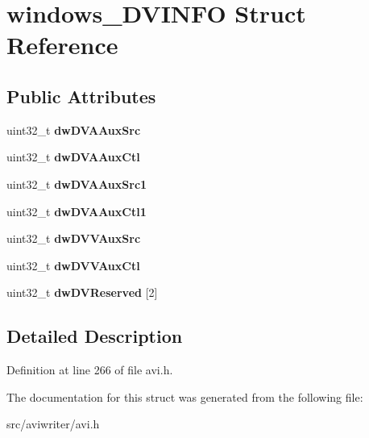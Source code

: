 \hypertarget{structwindows__DVINFO}{\section{windows\-\_\-\-D\-V\-I\-N\-F\-O Struct Reference}
\label{structwindows__DVINFO}
}
\subsection*{Public Attributes}
\begin{DoxyCompactItemize}
\item 
\hypertarget{structwindows__DVINFO_af9c99d343d9d098d07879ca20ac9487f}{uint32\-\_\-t {\bfseries dw\-D\-V\-A\-Aux\-Src}}\label{structwindows__DVINFO_af9c99d343d9d098d07879ca20ac9487f}

\item 
\hypertarget{structwindows__DVINFO_a0d099a096f4f1d1b686d22f54068febf}{uint32\-\_\-t {\bfseries dw\-D\-V\-A\-Aux\-Ctl}}\label{structwindows__DVINFO_a0d099a096f4f1d1b686d22f54068febf}

\item 
\hypertarget{structwindows__DVINFO_aeb2553b1821fb6070f457affbd30193b}{uint32\-\_\-t {\bfseries dw\-D\-V\-A\-Aux\-Src1}}\label{structwindows__DVINFO_aeb2553b1821fb6070f457affbd30193b}

\item 
\hypertarget{structwindows__DVINFO_ac1655c3c121d1dfdcf36cd156ee66f7b}{uint32\-\_\-t {\bfseries dw\-D\-V\-A\-Aux\-Ctl1}}\label{structwindows__DVINFO_ac1655c3c121d1dfdcf36cd156ee66f7b}

\item 
\hypertarget{structwindows__DVINFO_ad544d9e61f992f7c3ca1f0578ba07545}{uint32\-\_\-t {\bfseries dw\-D\-V\-V\-Aux\-Src}}\label{structwindows__DVINFO_ad544d9e61f992f7c3ca1f0578ba07545}

\item 
\hypertarget{structwindows__DVINFO_a275cd557f972b4b74f9637cd68d18092}{uint32\-\_\-t {\bfseries dw\-D\-V\-V\-Aux\-Ctl}}\label{structwindows__DVINFO_a275cd557f972b4b74f9637cd68d18092}

\item 
\hypertarget{structwindows__DVINFO_aab36802ccf4764ffe33d818a3fafce10}{uint32\-\_\-t {\bfseries dw\-D\-V\-Reserved} \mbox{[}2\mbox{]}}\label{structwindows__DVINFO_aab36802ccf4764ffe33d818a3fafce10}

\end{DoxyCompactItemize}


\subsection{Detailed Description}


Definition at line 266 of file avi.\-h.



The documentation for this struct was generated from the following file\-:\begin{DoxyCompactItemize}
\item 
src/aviwriter/avi.\-h\end{DoxyCompactItemize}
